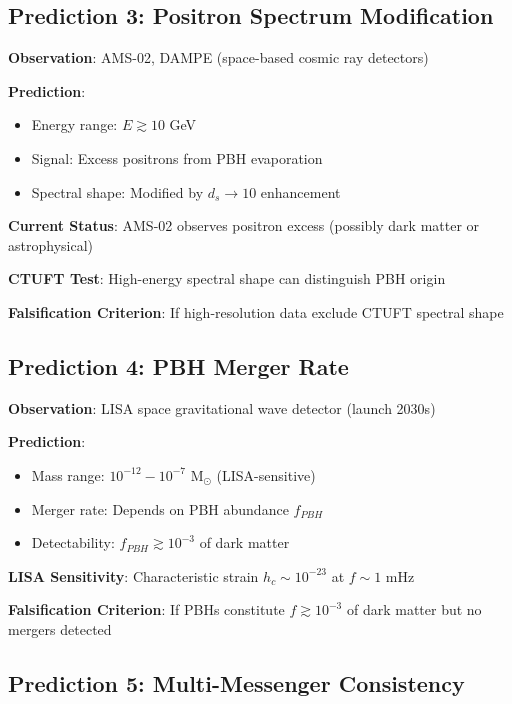 \subsection{Prediction 3: Positron Spectrum Modification}
\label{subsec:prediction-positron}

\textbf{Observation}: AMS-02, DAMPE (space-based cosmic ray detectors)

\textbf{Prediction}:
\begin{itemize}
    \item Energy range: $E \gtrsim 10$ GeV
    \item Signal: Excess positrons from PBH evaporation
    \item Spectral shape: Modified by $d_s \to 10$ enhancement
\end{itemize}

\textbf{Current Status}: AMS-02 observes positron excess (possibly dark matter or astrophysical)

\textbf{CTUFT Test}: High-energy spectral shape can distinguish PBH origin

\textbf{Falsification Criterion}: If high-resolution data exclude CTUFT spectral shape

\subsection{Prediction 4: PBH Merger Rate}
\label{subsec:prediction-merger}

\textbf{Observation}: LISA space gravitational wave detector (launch 2030s)

\textbf{Prediction}:
\begin{itemize}
    \item Mass range: $10^{-12} - 10^{-7}$ M$_\odot$ (LISA-sensitive)
    \item Merger rate: Depends on PBH abundance $f_{PBH}$
    \item Detectability: $f_{PBH} \gtrsim 10^{-3}$ of dark matter
\end{itemize}

\textbf{LISA Sensitivity}: Characteristic strain $h_c \sim 10^{-23}$ at $f \sim 1$ mHz

\textbf{Falsification Criterion}: If PBHs constitute $f \gtrsim 10^{-3}$ of dark matter but no mergers detected

\subsection{Prediction 5: Multi-Messenger Consistency}
\label{subsec:prediction-multi}

